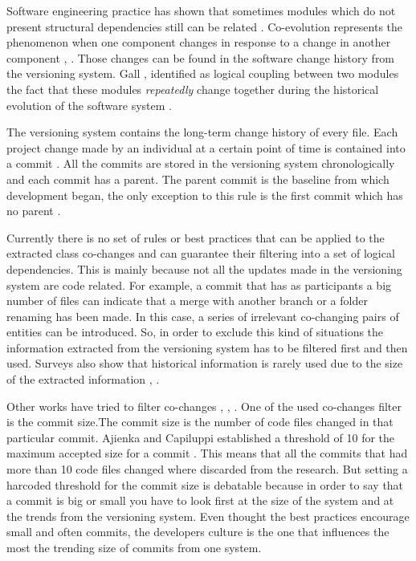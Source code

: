 Software engineering practice has shown that sometimes modules which do not present structural dependencies still can be related \cite{articleEvolution}. Co-evolution represents the phenomenon when one component changes in response to a change in another component \cite{Yu:2007:UCC:1231330.1231370}, \cite{5166450}. Those changes can be found in the software change history from the versioning system. Gall \cite{Gall:1998:DLC:850947.853338}, \cite{Gall:2003:CRH:942803.943741} identified as logical coupling between two modules the fact that these modules \textit{repeatedly} change together during the historical evolution of the software system \cite{6606615}.


The versioning system contains the long-term change history of every file. Each project change made by an individual at a certain point of time is contained into a commit \cite{7471284}. All the commits are stored in the versioning system chronologically and each commit has a parent. The parent commit is the baseline from which development began, the only exception to this rule is the first commit which has no parent \cite{svn}. 


Currently there is no set of rules or best practices that can be applied to the extracted class co-changes and can guarantee their filtering into a set of logical dependencies.
This is mainly because not all the updates made in the versioning system are code related. For example, a commit that has as participants a big number of files can indicate that a merge with another branch or a folder renaming has been made. In this case, a series of irrelevant co-changing pairs of entities can be introduced. So, in order to exclude this kind of situations the information extracted from the versioning system has to be filtered first and then used. Surveys also show that historical information is rarely used due to the size of the extracted information \cite{Shtern:2012:CMS:2332427.2332428}, \cite{sar}.

Other works have tried to filter co-changes \cite{Oliva:2011:ISL:2067853.2068086}, \cite{DBLP:journals/jss/AjienkaC17}, \cite{DBLP:conf/issre/OlivaG15}. One of the used co-changes filter is the commit size.The commit size is the number of code files changed in that particular commit. 
Ajienka and Capiluppi established a threshold of 10 for the maximum accepted size for a commit \cite{DBLP:journals/jss/AjienkaC17}. This means that all the commits that had more than 10 code files changed where discarded from the research. But setting a harcoded threshold for the commit size is debatable because in order to say that a commit is big or small you have to look first at the size of the system and at the trends from the versioning system. Even thought the best practices encourage small and often commits, the developers culture is the one that influences the most the trending size of commits from one system.

